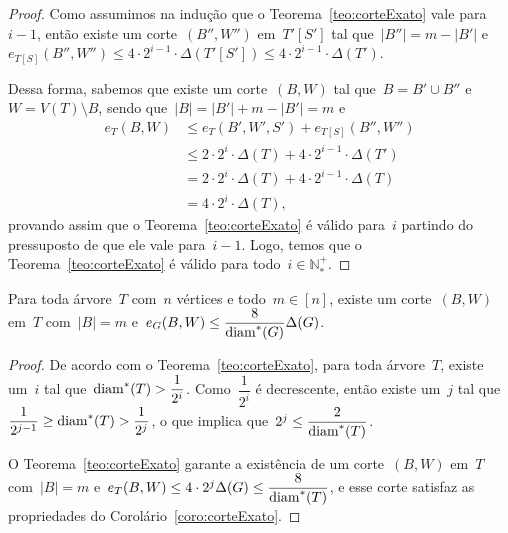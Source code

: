 \begin{proof}
			Como assumimos na indução que o Teorema~\ref{teo:corteExato} vale
			para~${i-1}$, então existe um corte~$(B'',W'')$ em~$T'[S']$
			tal que~${|B''|=m-|B'|}$ 
			e~${e_{T[S]}(B'',W'')\le 4\cdot 2^{i-1}\cdot
			\Delta(T'[S'])\le 4\cdot 2^{i-1}\cdot\Delta(T')}$.

			Dessa forma, sabemos que existe um corte~$(B,W)$ tal
			que~${B=B'\cup B''}$ e~${W=V(T)\setminus B}$, sendo 
			que~${|B|=|B'| + m-|B'| = m}$ e
			\begin{align}
				e_T(B,W)&\le e_T(B',W',S') + e_{T[S]}(B'',W'') 
				\nonumber\\
				&\le 2\cdot2^i\cdot\Delta(T) + 4\cdot 2^{i-1}\cdot
				\Delta(T')\nonumber\\
				&= 2\cdot2^i\cdot\Delta(T) + 4\cdot 2^{i-1}\cdot
				\Delta(T)\nonumber\\
				&= 4\cdot 2^{i}\cdot\Delta(T), \nonumber
			\end{align}
			provando assim que o Teorema~\ref{teo:corteExato} é
			válido para~$i$ partindo do pressuposto de que ele vale
			para~${i-1}$. Logo, temos que o 
			Teorema~\ref{teo:corteExato} é válido para 
			todo~${i\in \mathbb{N^+_*}}$.
			
	\end{proof}

	\bigskip
	\bigskip

	\begin{coro}
	\label{coro:corteExato}
		Para toda árvore~$T$ com~$n$ vértices e todo~${m\in[n]}$, existe
		um corte~$(B,W)$ em~$T$ com~${|B|=m}$ 
		e~${e_G(B,W)\le \dfrac{8}{\mathrm{diam}^*(G)}\Delta(G)}$.
	\end{coro}

	\begin{proof}
		De acordo com o Teorema~\ref{teo:corteExato}, para toda árvore~$T$,
		existe um~$i$ tal que~${\mathrm{diam}^*(T)>\dfrac{1}{2^i}}$. 
		Como~${\dfrac{1}{2^i}}$ é decrescente, então existe um~$j$ tal
		que~${\dfrac{1}{2^{j-1}}\ge\mathrm{diam}^*(T)>\dfrac{1}{2^j}}$,
		o que implica que~${2^j\le\dfrac{2}{\mathrm{diam}^*(T)}}$.

		O Teorema~\ref{teo:corteExato} garante a existência de um 
		corte~$(B,W)$ em~$T$ com~${|B|=m}$ 
		e~$e_T(B,W)\le 4\cdot 2^j\Delta(G)\le \dfrac{8}{\mathrm{diam}^*(T)}$,
		e esse corte satisfaz as propriedades do 
		Corolário~\ref{coro:corteExato}. 
	\end{proof}

